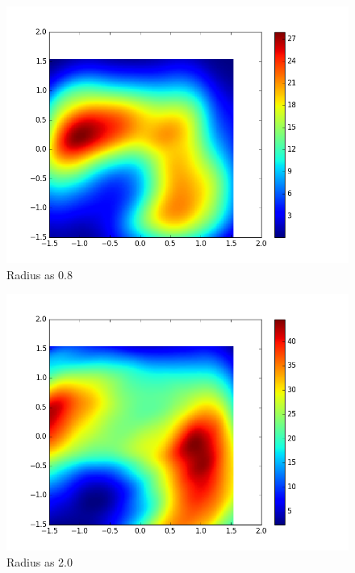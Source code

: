 \documentclass{article}
\begin{document}
\begin{figure}[H]
  \centering
  \begin{minipage}[b]{0.8\textwidth}
    \includegraphics[width=\textwidth]{LossPlot-2.png}
    \caption{Radius as 0.8}
  \end{minipage}
  \hfill
\end{figure}

\begin{figure}[H]
  \centering
  \begin{minipage}[b]{0.8\textwidth}
    \includegraphics[width=\textwidth]{LossPlot-3.png}
    \caption{Radius as 2.0}
  \end{minipage}
  \hfill
\end{figure}
\end{document}

